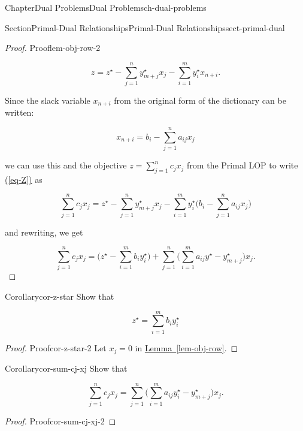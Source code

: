 \documentclass[oneside,10pt,]{book}
\newcommand{\xreffont}{\relax}
\numberwithin{equation}{section}
\begin{document}
\begin{chapterptx}{Chapter}{Dual Problems}{}{Dual Problems}{}{}{ch-dual-problems}
\begin{sectionptx}{Section}{Primal-Dual Relationships}{}{Primal-Dual Relationships}{}{}{sect-primal-dual}
\begin{proof}{Proof}{}{lem-obj-row-2}
\par
%
\begin{equation}
z= z^{\star}- \sum_{j=1}^{n} y^{\star}_{m+j}x_{j} -\sum_{i=1}^{m} y^{\star}_{i}x_{n+i}.\label{eq-Z}
\end{equation}
%
\par
Since the slack variable \(x_{n+i}\) from the original form of the dictionary can be written:%
\par
%
\begin{equation*}
x_{n+i} = b_{i} - \sum_{j=1}^{n} a_{ij}x_{j}
\end{equation*}
%
\par
we can use this and the objective \(z=\sum_{j=1}^n c_j x_j\) from the Primal LOP to write \hyperref[eq-Z]{({\xreffont\ref{eq-Z}})} as%
\par
%
\begin{equation*}
\sum_{j=1}^{n} c_{j} x_{j} = z^{\star}- \sum_{j=1}^{n} y^{\star}_{m+j}x_{j} - \sum_{i=1}^{m} y^{\star}_{i} \biggl( b_{i} - \sum_{j=1}^{n} a_{ij}x_{j} \biggr)
\end{equation*}
%
\par
and rewriting, we get%
\par
%
\begin{equation*}
\sum_{j=1}^{n} c_{j} x_{j} = \biggl( z^{\star}-\sum_{i=1}^{m} b_{i} y_{i}^{\star}\biggr) + \sum_{j=1}^{n} \biggl( \sum_{i=1}^{m} a_{ij}y^{\star} - y_{m+j}^{\star}\biggr) x_{j}.
\end{equation*}
%
\end{proof}
\begin{corollary}{Corollary}{}{}{cor-z-star}%
Show that%
\par
%
\begin{equation*}
z^{\star} = \sum_{i=1}^m b_i y^{\star}_i
\end{equation*}
%
\end{corollary}
\begin{proof}{Proof}{}{cor-z-star-2}
Let \(x_j=0\) in \hyperref[lem-obj-row]{Lemma~{\xreffont\ref{lem-obj-row}}}.%
\end{proof}
\begin{corollary}{Corollary}{}{}{cor-sum-cj-xj}%
Show that%
\par
%
\begin{equation*}
\sum_{j=1}^n c_j x_j = \sum_{j=1}^n \biggl( \sum_{i=1}^m a_{ij} y^{\star}_i - y^{\star}_{m+j} \biggr) x_j.
\end{equation*}
%
\end{corollary}
\begin{proof}{Proof}{}{cor-sum-cj-xj-2}

\end{proof}
\end{sectionptx}
\end{chapterptx}
\end{document}
